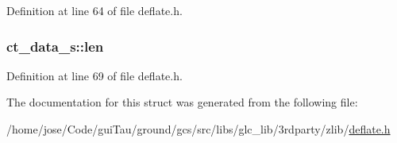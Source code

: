 Definition at line 64 of file deflate.\-h.

\hypertarget{structct__data__s_ad7f6929b2907e046dfbc8f091b494cfb}{
\subsubsection[{len}]{ ct\-\_\-data\-\_\-s\-::len}}\label{structct__data__s_ad7f6929b2907e046dfbc8f091b494cfb}


Definition at line 69 of file deflate.\-h.



The documentation for this struct was generated from the following file\-:\begin{DoxyCompactItemize}
\item 
/home/jose/\-Code/gui\-Tau/ground/gcs/src/libs/glc\-\_\-lib/3rdparty/zlib/\hyperlink{deflate_8h}{deflate.\-h}\end{DoxyCompactItemize}
